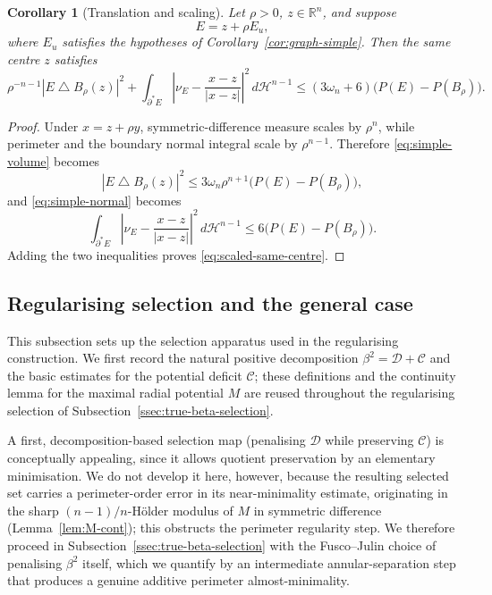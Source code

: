 \documentclass[11pt]{amsart}
\newtheorem{corollary}[theorem]{Corollary}
\theoremstyle{definition}
\newcommand{\R}{\mathbb R}
\newcommand{\Hn}{\mathcal H^{n-1}}
\newcommand{\Per}{P}
\newcommand{\Def}{\mathcal D}
\begin{document}
\begin{corollary}[Translation and scaling]\label{cor:scaled-graph}
Let \(\rho>0\), \(z\in\R^n\), and suppose
\[
   E=z+\rho E_u,
\]
where \(E_u\) satisfies the hypotheses of Corollary~\ref{cor:graph-simple}.
Then the same centre \(z\) satisfies
\[
   \rho^{-n-1}|E\mathbin{\triangle}B_\rho(z)|^2
   +
   \int_{\partial^*E}
      \left|\nu_E-\frac{x-z}{|x-z|}\right|^2\,d\Hn
   \le
   (3\omega_n+6)\bigl(\Per(E)-\Per(B_\rho)\bigr).
\tag{3.50}\label{eq:scaled-same-centre}
\]
\end{corollary}

\begin{proof}
Under \(x=z+\rho y\), symmetric-difference measure scales by \(\rho^n\),
while perimeter and the boundary normal integral scale by \(\rho^{n-1}\).
Therefore \eqref{eq:simple-volume} becomes
\[
   |E\mathbin{\triangle}B_\rho(z)|^2
   \le3\omega_n\rho^{n+1}
        \bigl(\Per(E)-\Per(B_\rho)\bigr),
\]
and \eqref{eq:simple-normal} becomes
\[
   \int_{\partial^*E}
      \left|\nu_E-\frac{x-z}{|x-z|}\right|^2\,d\Hn
   \le6\bigl(\Per(E)-\Per(B_\rho)\bigr).
\]
Adding the two inequalities proves \eqref{eq:scaled-same-centre}.
\end{proof}

\subsection{Regularising selection and the general case}
\label{app-sec:selection}

This subsection sets up the selection apparatus used in the regularising
construction.  We first record the natural positive decomposition
\(\beta^2=\Def+\mathcal C\) and the basic estimates for the potential
deficit \(\mathcal C\); these definitions and the continuity lemma for the
maximal radial potential \(M\) are reused throughout the regularising
selection of Subsection~\ref{ssec:true-beta-selection}.

A first, decomposition-based selection map (penalising \(\Def\) while
preserving \(\mathcal C\)) is conceptually appealing, since it allows
quotient preservation by an elementary minimisation.  We do not develop it
here, however, because the resulting selected set carries a perimeter-order
error in its near-minimality estimate, originating in the sharp
\((n-1)/n\)-Hölder modulus of \(M\) in symmetric difference
(Lemma~\ref{lem:M-cont}); this obstructs the perimeter regularity step.  We
therefore proceed in Subsection~\ref{ssec:true-beta-selection} with the
Fusco--Julin choice of penalising \(\beta^2\) itself, which we quantify by
an intermediate annular-separation step that produces a genuine additive
perimeter almost-minimality.
\end{document}
